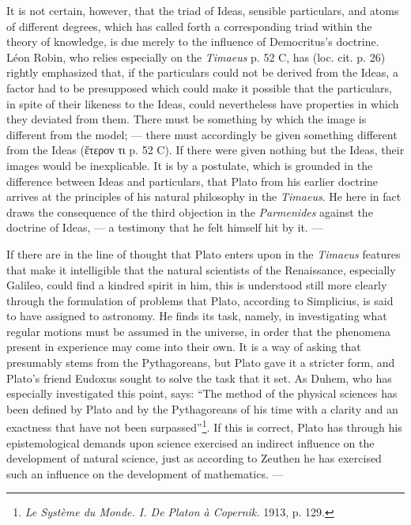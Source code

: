 \documentclass[12pt,a4paper,openany]{book}
\newcommand{\opage}[1]{\marginnote{\footnotesize\textit{[#1]}}}
\begin{document}
It is not certain, however, that the triad of Ideas, sensible
particulars, and atoms of different degrees, which has
\setcounter{footnote}{0}%
\opage{64}called forth a corresponding triad within the theory of knowledge,
is due merely to the influence of Democritus's doctrine.  Léon
Robin, who relies especially on the \textit{Timaeus} p. 52 C, has (loc.
cit. p. 26) rightly emphasized that, if the particulars could not
be derived from the Ideas, a factor had to be presupposed
which could make it possible that the particulars, in spite of their
likeness to the Ideas, could nevertheless have properties in which they
deviated from them.  There must be something by which the image is
different from the model; --- there must accordingly be given something
different from the Ideas (ἕτερον τι p. 52 C).  If there
were given nothing but the Ideas, their images would be inexplicable.
It is by a postulate, which is grounded in the difference
between Ideas and particulars, that Plato from his earlier
doctrine arrives at the principles of his natural philosophy in
the \textit{Timaeus}.  He here in fact draws the consequence of the
third objection in the \textit{Parmenides} against the doctrine of Ideas, --- a
testimony that he felt himself hit by it. ---

If there are in the line of thought that Plato enters upon in the
\textit{Timaeus} features that make it intelligible that the natural
scientists of the Renaissance, especially Galileo, could find a kindred spirit in
him, this is understood still more clearly through the formulation of problems
that Plato, according to Simplicius, is said to have assigned to astronomy.
He finds its task, namely, in investigating
what regular motions must be assumed in the universe,
in order that the phenomena present in experience may
come into their own.  It is a way of asking that
presumably stems from the Pythagoreans, but Plato gave it
a stricter form, and Plato's friend Eudoxus sought to solve
the task that it set.  As Duhem, who has especially
investigated this point, says: ``The method of the physical sciences
has been defined by Plato and by the Pythagoreans
of his time with a clarity and an exactness that
\setcounter{footnote}{0}%
\opage{65}have not been surpassed''\footnote[1]{\textit{Le Système du Monde. I. De Platon à Copernik.} 1913, p. 129.}.  If this is correct, Plato has
through his epistemological demands upon science
exercised an indirect influence on the development of natural science,
just as according to Zeuthen he has exercised such an
influence on the development of mathematics. ---
\end{document}
